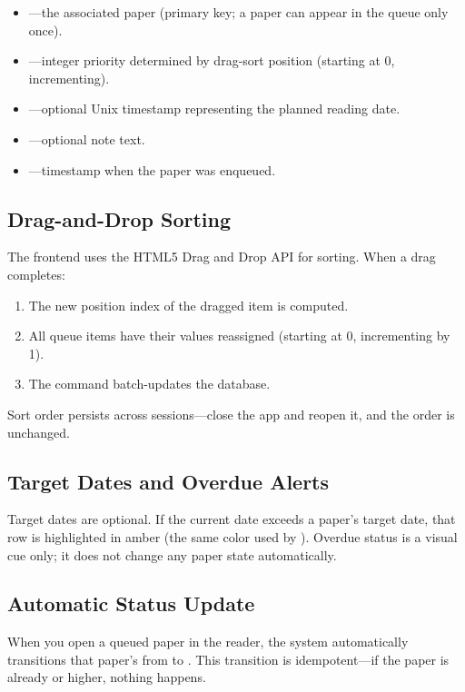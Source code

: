\begin{itemize}
  \item {}---the associated paper (primary key; a paper can appear in the
    queue only once).
  \item {}---integer priority determined by drag-sort position (starting
    at 0, incrementing).
  \item {}---optional Unix timestamp representing the planned reading
    date.
  \item {}---optional note text.
  \item {}---timestamp when the paper was enqueued.
\end{itemize}

\subsection{Drag-and-Drop Sorting}

The frontend uses the HTML5 Drag and Drop API for sorting. When a drag completes:

\begin{enumerate}
  \item The new position index of the dragged item is computed.
  \item All queue items have their  values reassigned (starting at 0,
    incrementing by 1).
  \item The  command batch-updates the database.
\end{enumerate}

Sort order persists across sessions---close the app and reopen it, and the order is
unchanged.

\subsection{Target Dates and Overdue Alerts}

Target dates are optional. If the current date exceeds a paper's target date, that row
is highlighted in amber (the same color used by ). Overdue status is a
visual cue only; it does not change any paper state automatically.

\subsection{Automatic Status Update}

When you open a queued paper in the reader, the system automatically transitions that
paper's  from  to . This transition is
idempotent---if the paper is already  or higher, nothing happens.

